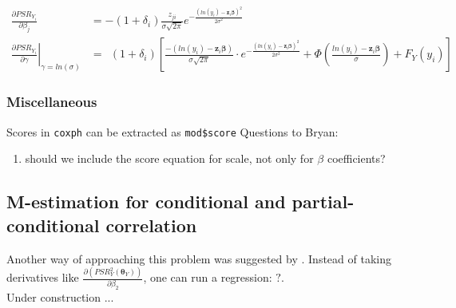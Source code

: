 \documentclass[]{article}
\begin{document}
  $$
  \begin{aligned}
    \frac{\partial PSR_{Y_i}}{\partial \beta_j} & =  -(1+\delta_i) \frac{z_{ji} }{\sigma\sqrt{2\pi} }    e^{ - \frac{\left( ln(y_i) -\pmb{z}_i\pmb{\beta} \right)^2}{2\sigma^2} }\\
    \left.\frac{\partial PSR_{Y_i}}{\partial \gamma}\right|_{\gamma = ln(\sigma)} &=~~(1+\delta_i)\left[    \frac{-(ln(y_i) - \pmb{z}_i\pmb{\beta})}{ \sigma\sqrt{2 \pi } }  \cdot e^{-\frac{(ln(y_i) - \pmb{z}_i\pmb{\beta})^2}{2\sigma^2}}   +  \Phi\left(  \frac{ln(y_i) - \pmb{z}_i\pmb{\beta}}{\sigma}  \right) + F_Y(y_i)    \right]
  \end{aligned}
  $$


\clearpage
\subsubsection{Miscellaneous}
Scores in \texttt{coxph} can be extracted as \texttt{mod\$score}
Questions to Bryan:
\begin{enumerate}[1)]
  \item should we include the score equation for scale, not only for $\beta$ coefficients?
\end{enumerate}

\subsection{M-estimation for conditional and partial-conditional correlation}
Another way of approaching this problem was suggested by \cite{lui2015covariate}. Instead of taking derivatives like $\frac{\partial (PSR_Y^2(\pmb{\theta}_Y))}{\partial \beta_2}$, one can run a regression: $?$.\\
Under construction ...


%

\printbibliography
\end{document}
